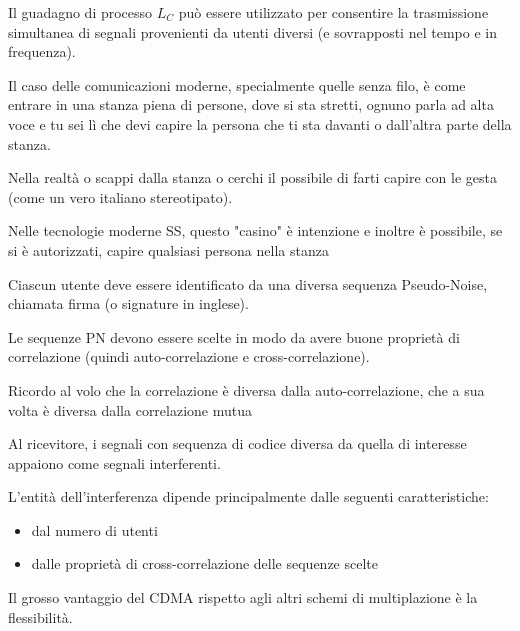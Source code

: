 Il guadagno di processo $L_C$ può essere utilizzato per consentire la trasmissione 
simultanea di segnali provenienti da utenti diversi (e sovrapposti nel tempo e in frequenza). \newline 

\begin{tcolorbox}
    Il caso delle comunicazioni moderne, specialmente quelle senza filo, 
    è come entrare in una stanza piena di persone, dove si sta stretti, 
    ognuno parla ad alta voce e tu sei lì che devi capire la persona che ti sta davanti o dall'altra parte della stanza. \newline 

    Nella realtà o scappi dalla stanza o cerchi il possibile di farti capire con le gesta (come un vero italiano stereotipato). \newline 

    Nelle tecnologie moderne SS, questo "casino" è intenzione e inoltre è possibile, 
    se si è autorizzati, capire qualsiasi persona nella stanza
\end{tcolorbox}

Ciascun utente deve essere identificato da una diversa sequenza Pseudo-Noise, 
chiamata firma (o signature in inglese). \newline 

Le sequenze PN devono essere scelte in modo da avere buone proprietà di correlazione 
(quindi auto-correlazione e cross-correlazione). \newline 

\begin{tcolorbox}
    Ricordo al volo che la correlazione è diversa dalla auto-correlazione, 
    che a sua volta è diversa dalla correlazione mutua
\end{tcolorbox}

Al ricevitore, 
i segnali con sequenza di codice diversa da quella di interesse 
appaiono come segnali interferenti. \newline 

L'entità dell'interferenza dipende principalmente dalle seguenti caratteristiche: 

\begin{itemize}
    \item dal numero di utenti 
    \item dalle proprietà di cross-correlazione delle sequenze scelte
\end{itemize}

Il grosso vantaggio del CDMA rispetto agli altri schemi di multiplazione è la flessibilità. \newline 

